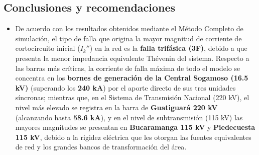 \subsection{Conclusiones y recomendaciones}
\begin{itemize}
    \item De acuerdo con los resultados obtenidos mediante el Método Completo de simulación, el tipo de falla que origina la mayor magnitud de corriente de cortocircuito inicial ($I_k''$) en la red es la \textbf{falla trifásica (3F)}, debido a que presenta la menor impedancia equivalente Thévenin del sistema. Respecto a las barras más críticas, la corriente de falla máxima de todo el modelo se concentra en los \textbf{bornes de generación de la Central Sogamoso (16.5 kV)} (superando los \textbf{240 kA}) por el aporte directo de sus tres unidades síncronas; mientras que, en el Sistema de Transmisión Nacional (220 kV), el nivel más elevado se registra en la barra de \textbf{Guatiguará 220 kV} (alcanzando hasta \textbf{58.6 kA}), y en el nivel de subtransmisión (115 kV) las mayores magnitudes se presentan en \textbf{Bucaramanga 115 kV} y \textbf{Piedecuesta 115 kV}, debido a la rigidez eléctrica que les otorgan las fuentes equivalentes de red  y los grandes bancos de transformación del área.


\end{itemize}

